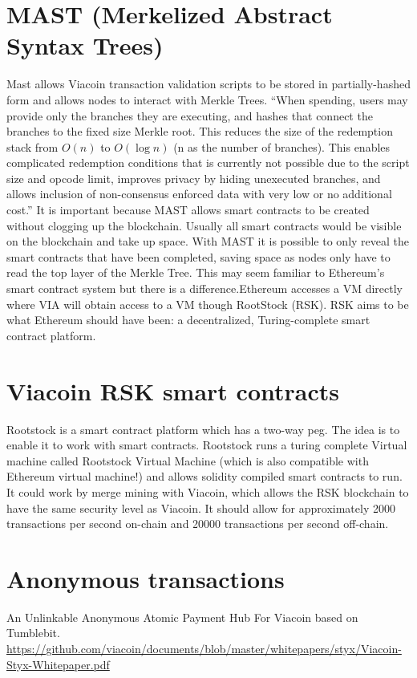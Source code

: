 \documentclass{article}
\begin{document}
\section{MAST (Merkelized Abstract Syntax Trees)} \label{MAST (Merkelized Abstract Syntax Trees)}
\cite{MAST}Mast allows Viacoin transaction validation scripts to be stored in partially-hashed
form and allows nodes to interact with Merkle Trees.
“When spending, users may provide only the branches they are executing, and
hashes that connect the branches to the fixed size Merkle root. This reduces the
size of the redemption stack from $O(n)$ to $O(\log{}n)$ (n as the number of branches).
This enables complicated redemption conditions that is currently not possible
due to the script size and opcode limit, improves privacy by hiding unexecuted
branches, and allows inclusion of non-consensus enforced data with very low or
no additional cost.” \newline \newline \noindent
It is important because MAST allows smart contracts to be created without
clogging up the blockchain. Usually all smart contracts would be visible on the
blockchain and take up space. With MAST it is possible to only reveal the smart contracts that have
been completed, saving space as nodes only have to read the top layer of the
Merkle Tree.
\noindent
This may seem familiar to Ethereum's smart contract system but there is a difference.Ethereum accesses a VM directly
where VIA will obtain access to a VM though RootStock (RSK).
RSK aims to be what Ethereum should have been: a decentralized, Turing-complete smart
contract platform.

\section{Viacoin RSK smart contracts} \label{Viacoin RSK smart contracts}
\cite{rootstock}Rootstock is a smart contract platform which has a two-way peg. The idea is to
enable it to work with smart contracts. Rootstock runs a turing complete Virtual
machine called Rootstock Virtual Machine (which is also compatible with Ethereum
virtual machine!) and allows solidity compiled smart contracts to run.
It could work by merge mining with Viacoin, which allows the RSK blockchain to
have the same security level as Viacoin. It should allow for approximately 2000
transactions per second on-chain and 20000 transactions per second off-chain.

\section{Anonymous transactions} \label{Anonymous transactions}
\cite{styx}An Unlinkable Anonymous Atomic Payment Hub For Viacoin based on Tumblebit.\newline
\url{https://github.com/viacoin/documents/blob/master/whitepapers/styx/Viacoin-Styx-Whitepaper.pdf}
\newpage
\printbibliography
\end{document}
